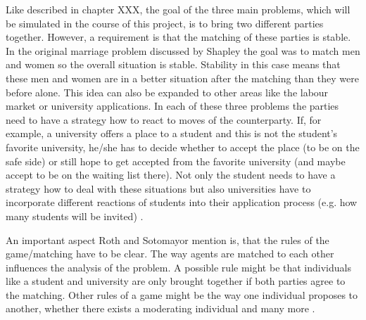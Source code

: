 Like described in chapter XXX, the goal of the three main problems, which will be simulated in the course of this project, is to bring two different parties together.
However, a requirement is that the matching of these parties is stable.
In the original marriage problem discussed by Shapley the goal was to match men and women so the overall situation is stable.
Stability in this case means that these men and women are in a better situation after the matching than they were before alone. 
This idea can also be expanded to other areas like the labour market or university applications.
In each of these three problems the parties need to have a strategy how to react to moves of the counterparty.
If, for example, a university offers a place to a student and this is not the student's favorite university, he/she has to decide whether to accept the place (to be on the safe side) or still hope to get accepted from the favorite university (and maybe accept to be on the waiting list there).
Not only the student needs to have a strategy how to deal with these situations but also universities have to incorporate different reactions of students into their application process (e.g. how many students will be invited) \cite {gale62a}.

An important aspect Roth and Sotomayor mention is, that the rules of the game/matching have to be clear.
The way agents are matched to each other influences the analysis of the problem.
A possible rule might be that individuals like a student and university are only brought together if both parties agree to the matching.
Other rules of a game might be the way one individual proposes to another, whether there exists a moderating individual and many more \cite[p. 492]{roth1992two}.
